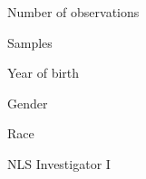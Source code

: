 \begin{frame}\begin{figure}[htp]\centering
\caption{Number of observations}
\end{figure}\end{frame}
\begin{frame}\begin{figure}[htp]\centering
\caption{Samples}
\end{figure}\end{frame}
\begin{frame}\begin{figure}[htp]\centering
\caption{Year of birth}
\end{figure}\end{frame}
\begin{frame}\begin{figure}[htp]\centering
\caption{Gender}
\end{figure}\end{frame}
\begin{frame}\begin{figure}[htp]\centering
\caption{Race}
\end{figure}\end{frame}
\begin{frame}\begin{figure}[htp]\centering
\caption{NLS Investigator I}
\end{figure}\end{frame}
